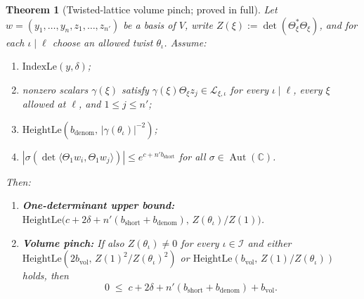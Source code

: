 \documentclass[11pt]{amsart}
\newcommand{\CC}{\mathbb{C}}
\newtheorem{theorem}{Theorem}[section]
\theoremstyle{definition}
\theoremstyle{remark}
\begin{document}
\begin{theorem}[Twisted-lattice volume pinch; proved in full]\label{thm:pinch}
Let $w=(y_1,\dots,y_n,z_1,\dots,z_{n'})$ be a basis of $V$, write $Z(\xi):=\det(\Theta_\xi^*\Theta_\xi)$, and for each $\iota\mid\ell$ choose an allowed twist $\theta_\iota$. Assume:
\begin{enumerate}
\item[(H1)] $\mathrm{IndexLe}(y,\delta)$;
\item[(H2)] nonzero scalars $\gamma(\xi)$ satisfy $\gamma(\xi)\Theta_\xi z_j\in\mathcal{L}_{\xi,\iota}$ for every $\iota\mid\ell$, every $\xi$ allowed at $\ell$, and $1\le j\le n'$;
\item[(H3)] $\mathrm{HeightLe}(b_{\mathrm{denom}},\,|\gamma(\theta_\iota)|^{-2})$;
\item[(H4)] $|\sigma(\det\langle\Theta_1 w_i,\Theta_1 w_j\rangle)|\le e^{c+n'b_{\mathrm{short}}}$ for all $\sigma\in\operatorname{Aut}(\CC)$.
\end{enumerate}
Then:
\begin{enumerate}
\item \textbf{One-determinant upper bound:} $\mathrm{HeightLe}\bigl(c+2\delta+n'(b_{\mathrm{short}}+b_{\mathrm{denom}}),\,Z(\theta_\iota)/Z(1)\bigr)$.
\item \textbf{Volume pinch:} If also $Z(\theta_\iota)\ne 0$ for every $\iota\in\mathcal{I}$ and either $\mathrm{HeightLe}(2b_{\mathrm{vol}},\,Z(1)^2/Z(\theta_\iota)^2)$ or $\mathrm{HeightLe}(b_{\mathrm{vol}},\,Z(1)/Z(\theta_\iota))$ holds, then
\begin{equation}\label{eq:pinch_ineq}
 0 \;\le\; c + 2\delta + n'(b_{\mathrm{short}}+b_{\mathrm{denom}}) + b_{\mathrm{vol}}.
\end{equation}
\end{enumerate}
\end{theorem}
\end{document}

